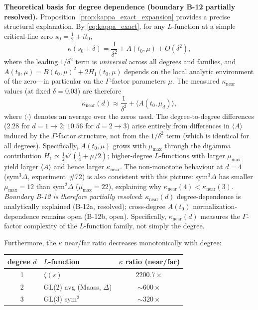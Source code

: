 \documentclass[11pt, a4paper]{article}
\theoremstyle{definition}
\theoremstyle{plain}
\begin{document}
\medskip\noindent
\textbf{Theoretical basis for degree dependence (boundary B-12 partially resolved).}\;
Proposition~\ref{prop:kappa_exact_expansion} provides a precise structural explanation.
By \eqref{eq:kappa_exact}, for any $L$-function at a simple critical-line zero $s_0 = \tfrac12+it_0$,
\[
  \kappa(s_0 + \delta) = \frac{1}{\delta^2} + A(t_0,\mu) + O(\delta^2),
\]
where the leading $1/\delta^2$ term is \emph{universal} across all degrees and families,
and $A(t_0,\mu) = B(t_0,\mu)^2 + 2H_1(t_0,\mu)$ depends on the local analytic environment
of the zero---in particular on the $\Gamma$-factor parameters $\mu$.
The measured $\kappa_{\mathrm{near}}$ values (at fixed $\delta = 0.03$) are therefore
\[
  \kappa_{\mathrm{near}}(d) \approx \frac{1}{\delta^2} + \langle A(t_0,\mu_d)\rangle,
\]
where $\langle\cdot\rangle$ denotes an average over the zeros used.
The degree-to-degree differences ($2.28$ for $d{=}1{\to}2$; $10.56$ for $d{=}2{\to}3$)
arise entirely from differences in $\langle A\rangle$ induced by the $\Gamma$-factor structure,
not from the $1/\delta^2$ term (which is identical for all degrees).
Specifically, $A(t_0,\mu)$ grows with $\mu_{\max}$ through the digamma contribution
$H_1 \propto \tfrac{1}{2}\psi'(\tfrac14 + \mu/2)$; higher-degree $L$-functions with
larger $\mu_{\max}$ yield larger $\langle A\rangle$ and hence larger $\kappa_{\mathrm{near}}$.
The non-monotone behaviour at $d{=}4$ (sym$^3\Delta$, experiment~\#72) is also consistent
with this picture: sym$^3\Delta$ has smaller $\mu_{\max}{=}12$ than sym$^2\Delta$ ($\mu_{\max}{=}22$),
explaining why $\kappa_{\mathrm{near}}(4) < \kappa_{\mathrm{near}}(3)$.
\emph{Boundary B-12 is therefore partially resolved}: $\kappa_{\mathrm{near}}(d)$ degree-dependence is analytically explained (B-12a, resolved); cross-degree $A(t_0)$ normalization-dependence remains open (B-12b, open). Specifically, $\kappa_{\mathrm{near}}(d)$ measures
the $\Gamma$-factor complexity of the $L$-function family, not simply the degree.

Furthermore, the $\kappa$ near/far ratio decreases monotonically with degree:

\smallskip
\begin{center}
\small
\begin{tabular}{clc}
\toprule
degree $d$ & $L$-function & $\kappa$ ratio (near/far) \\
\midrule
1 & $\zeta(s)$ & $2200.7\times$ \\
2 & GL(2) avg (Maass, $\Delta$) & ${\sim}600\times$ \\
3 & GL(3) sym$^2$ & ${\sim}320\times$ \\
\bottomrule
\end{tabular}
\end{center}
\smallskip
\end{document}
